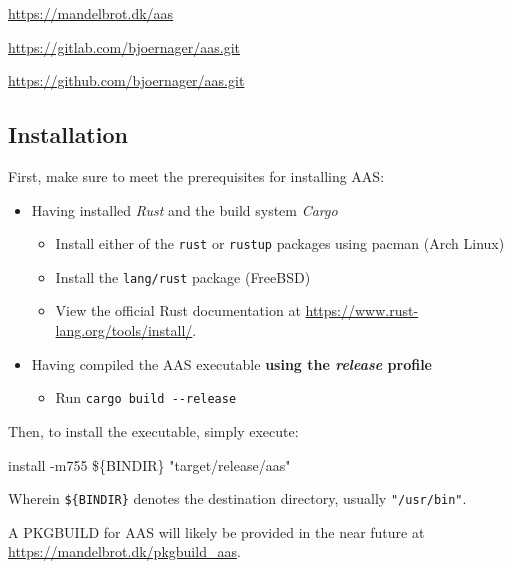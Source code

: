 \documentclass[a4paper]{article}
\begin{document}
			\begin{center}
				\begin{varwidth}{\linewidth}
					\url{https://mandelbrot.dk/aas}

					\url{https://gitlab.com/bjoernager/aas.git}

					\url{https://github.com/bjoernager/aas.git}
				\end{varwidth}
			\end{center}

		\subsection{Installation}
			First, make sure to meet the prerequisites for installing AAS:

			\begin{itemize}
				\item Having installed \textit{Rust} and the build system \textit{Cargo}
				\begin{itemize}
					\item Install either of the \texttt{rust} or \texttt{rustup} packages using pacman (Arch Linux)
					\item Install the \texttt{lang/rust} package (FreeBSD)
					\item View the official Rust documentation at \url{https://www.rust-lang.org/tools/install/}.
				\end{itemize}
				\item Having compiled the AAS executable \textbf{using the \textit{release} profile}
				\begin{itemize}
					\item Run \texttt{cargo build -{}-release}
				\end{itemize}
			\end{itemize}

			Then, to install the executable, simply execute:

			\begin{center}
				\begin{varwidth}{\linewidth}
					\ttfamily
					install -m755 \$\{BINDIR\} "target/release/aas"
				\end{varwidth}
			\end{center}

			Wherein \texttt{\$\{BINDIR\}} denotes the destination directory, usually \texttt{"/usr/bin"}.

			A PKGBUILD for AAS will likely be provided in the near future at \url{https://mandelbrot.dk/pkgbuild_aas}.
\end{document}
